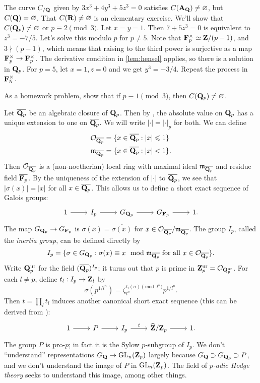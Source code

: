 \begin{example}[Selmer]
The curve $C_{/\mathbf{Q}}$ given by $3 x^3+4 y^3+5 z^3=0$ satisfies 
$C(\mathbf{A}_{\mathbf{Q}})\ne \varnothing$, but $C(\mathbf{Q})=\varnothing$. That 
$C(\mathbf{R})\ne \varnothing$ is an elementary exercise. We'll show that 
$C(\mathbf{Q}_p)\ne\varnothing$ or $p\equiv 2\pmod 3$. Let $x=y=1$. Then 
$7+5 z^3=0$ is equivalent to $z^3=-7/5$. Let's solve this modulo $p$ 
for $p\ne 5$. Note that $\mathbf{F}_p^\times \simeq \mathbf{Z}/(p-1)$, and 
$3\nmid (p-1)$, which means that raising to the third power is surjective 
as a map $\mathbf{F}_p^\times\to \mathbf{F}_p^\times$. The derivative condition in 
\autoref{lem:hensel} applies, so there is a solution in $\mathbf{Q}_p$. For $p=5$, 
let $x=1,z=0$ and we get $y^3=-3/4$. Repeat the process in $\mathbf{F}_5^\times$. 
\end{example}

As a homework problem, show that if $p\equiv 1\pmod 3$, then 
$C(\mathbf{Q}_p)\ne\varnothing$. 

Let $\overline{\mathbf{Q}_p}$ be an algebraic closure of $\mathbf{Q}_p$. Then by 
\cite[II 6.6]{neukirch-1999}, the absolute value on $\mathbf{Q}_p$ has a unique 
extension to one on $\overline{\mathbf{Q}_p}$. We will write $|\cdot|=|\cdot|_p$ for 
both. We can define 
\begin{align*}
  \mathcal{O}_{\overline{\mathbf{Q}_p}} &= \{x\in \overline{\mathbf{Q}_p}:|x| \leqslant 1 \} \\
  \mathfrak{m}_{\overline{\mathbf{Q}_p}} &= \{x\in \overline{\mathbf{Q}_p}:|x|<1\} .
\end{align*}
Then $\mathcal{O}_{\overline{\mathbf{Q}_p}}$ is a (non-noetherian) local ring with maximal 
ideal $\mathfrak{m}_{\overline{\mathbf{Q}_p}}$ and residue field $\overline{\mathbf{F}_p}$. By the 
uniqueness of the extension of $|\cdot|$ to $\overline{\mathbf{Q}_p}$, we see that 
$|\sigma(x)|=|x|$ for all $x\in \overline{\mathbf{Q}_p}$. This allows us to define a 
short exact sequence of Galois groups: 
\[\begin{tikzcd}
  1 \ar[r] 
    & I_p \ar[r] 
    & G_{\dQ_p} \ar[r] 
    & G_{\dF_p} \ar[r] 
    & 1 .
\end{tikzcd}\]
The map $G_{\mathbf{Q}_p}\to G_{\mathbf{F}_p}$ is $\sigma(\bar x)=\overline{\sigma(x)}$ for 
$\bar x\in \mathcal{O}_{\overline{\mathbf{Q}_p}}/\mathfrak{m}_{\overline{\mathbf{Q}_p}}$. The group $I_p$, 
called the \emph{inertia group}, can be defined directly by 
\[
  I_p = \{\sigma\in G_{\mathbf{Q}_p} : \sigma(x)\equiv x\mod{\mathfrak{m}}_{\overline{\mathbf{Q}_p}} \text{ for all }x\in \mathcal{O}_{\overline{\mathbf{Q}_p}}\} .
\]
Write $\mathbf{Q}_p^{\mathrm{ur}}$ for the field $(\overline{\mathbf{Q}_p})^{I_p}$; it turns out that 
$p$ is prime in $\mathbf{Z}_p^{\mathrm{ur}}=\mathcal{O}_{\mathbf{Q}_p^{\mathrm{ur}}}$. For each $l\ne p$, define 
$t_l:I_p \to \mathbf{Z}_l$ by 
\[
  \sigma(p^{1/l^n}) = \zeta_{l^n}^{t_l(\sigma)\pmod{l^n}} p^{1/l^n} .
\]
Then $t=\prod_l t_l$ induces another canonical short exact sequence 
(this can be derived from \cite[II 7.7]{neukirch-1999}):
\[\begin{tikzcd}
  1 \ar[r] 
    & P \ar[r] 
    & I_p \ar[r, "t"] 
    & \widehat\dZ / \dZ_p \ar[r] 
    & 1 .
\end{tikzcd}\]
The group $P$ is pro-$p$; in fact it is the Sylow $p$-subgroup of $I_p$. We 
don't ``understand'' representations 
$G_{\mathbf{Q}}\to \operatorname{GL}_n(\mathbf{Z}_p)$ largely because 
$G_{\mathbf{Q}}\supset G_{\mathbf{Q}_p}\supset P$, and we don't understand the 
image of $P$ in $\operatorname{GL}_n(\mathbf{Z}_p)$. The field of \emph{$p$-adic Hodge 
theory} seeks to understand this image, among other things. 

